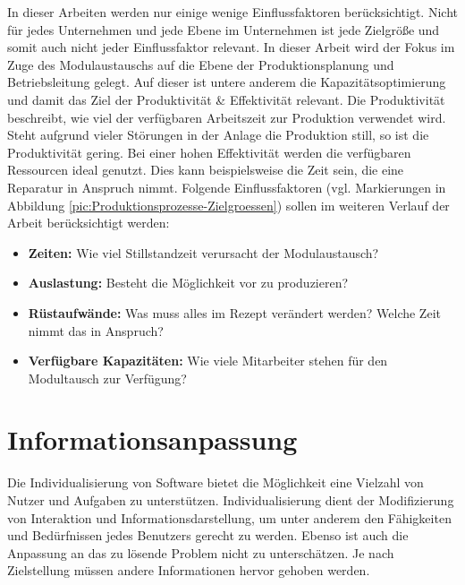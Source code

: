 In dieser Arbeiten werden nur einige wenige Einflussfaktoren berücksichtigt. Nicht für jedes Unternehmen und jede Ebene im Unternehmen ist jede Zielgröße und somit auch nicht jeder Einflussfaktor relevant. In dieser Arbeit wird der Fokus im Zuge des Modulaustauschs auf die Ebene der Produktionsplanung und Betriebsleitung gelegt. Auf dieser ist untere anderem die Kapazitätsoptimierung und damit das Ziel der Produktivität \& Effektivität relevant. Die Produktivität beschreibt, wie viel der verfügbaren Arbeitszeit zur Produktion verwendet wird. Steht aufgrund vieler Störungen in der Anlage die Produktion still, so ist die Produktivität gering. Bei einer hohen Effektivität werden die verfügbaren Ressourcen ideal genutzt. Dies kann beispielsweise die Zeit sein, die eine Reparatur in Anspruch nimmt. Folgende Einflussfaktoren (vgl. Markierungen in Abbildung \ref{pic:Produktionsprozesse-Zielgroessen}) sollen im weiteren Verlauf der Arbeit berücksichtigt werden:
\begin{itemize}
\item \textbf{Zeiten:} Wie viel Stillstandzeit verursacht der Modulaustausch?
\item \textbf{Auslastung:} Besteht die Möglichkeit vor zu produzieren?
\item \textbf{Rüstaufwände:} Was muss alles im Rezept verändert werden? Welche Zeit nimmt das in Anspruch?
\item \textbf{Verfügbare Kapazitäten:} Wie viele Mitarbeiter stehen für den Modultausch zur Verfügung? 
\end{itemize}

\section{Informationsanpassung}
Die Individualisierung von Software bietet die Möglichkeit eine Vielzahl von Nutzer und Aufgaben zu unterstützen. Individualisierung dient der Modifizierung von Interaktion und Informationsdarstellung, um unter anderem den Fähigkeiten und Bedürfnissen jedes Benutzers gerecht zu werden. Ebenso ist auch die Anpassung an das zu lösende Problem nicht zu unterschätzen. Je nach Zielstellung müssen andere Informationen hervor gehoben werden.

